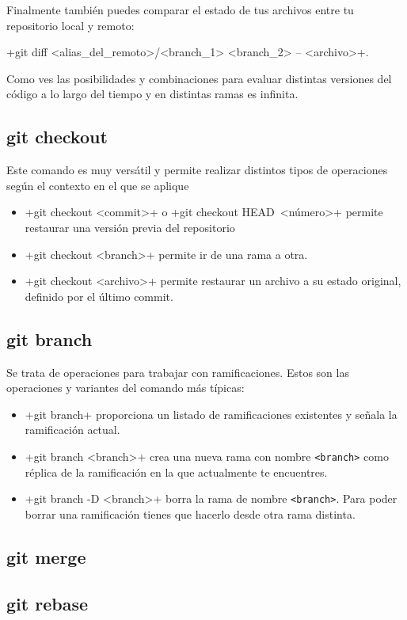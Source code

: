 \documentclass[a5paper, oneside,10pt]{article}
\begin{document}
    Finalmente también puedes comparar el estado de tus archivos entre tu repositorio local y remoto:
    
    \cverb+git diff <alias_del_remoto>/<branch_1> <branch_2> -- <archivo>+.
    
    Como ves las posibilidades y combinaciones para evaluar distintas versiones del código a lo largo del tiempo y en distintas ramas es infinita.
    
    \subsection{git checkout}
      Este comando es muy versátil y permite realizar distintos tipos de operaciones según el contexto en el que se aplique
      \begin{itemize}
       \item \cverb+git checkout <commit>+ o \cverb+git checkout HEAD~<número>+ permite restaurar una versión previa del repositorio
       \item \cverb+git checkout <branch>+ permite ir de una rama a otra.
       \item \cverb+git checkout <archivo>+ permite restaurar un archivo a su estado original, definido por el último commit.
      \end{itemize}
      
    \subsection{git branch}
      Se trata de operaciones para trabajar con ramificaciones. Estos son las operaciones y variantes del comando más típicas:
      
      \begin{itemize}
       \item \cverb+git branch+ proporciona un listado de ramificaciones existentes y señala la ramificación actual.
       \item \cverb+git branch <branch>+ crea una nueva rama con nombre \verb+<branch>+ como réplica de la ramificación en la que actualmente te encuentres.
       \item \cverb+git branch -D <branch>+ borra la rama de nombre \verb+<branch>+. Para poder borrar una ramificación tienes que hacerlo desde otra rama distinta.
      \end{itemize}
    
    \subsection{git merge}
    
    \subsection{git rebase}


 
\end{document}
